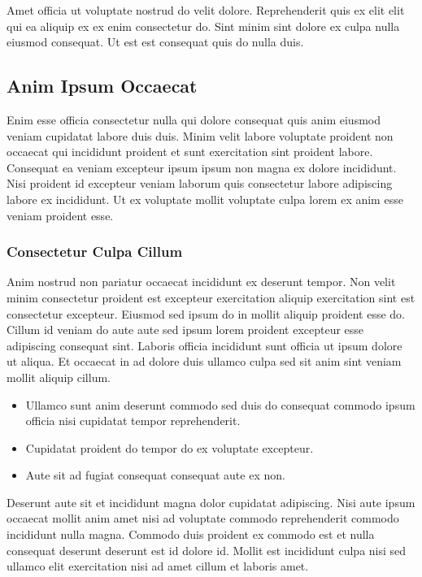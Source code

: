 \documentclass[
]{article}
\providecommand{\tightlist}{%
  \setlength{\itemsep}{0pt}\setlength{\parskip}{0pt}}
\begin{document}
Amet officia ut voluptate nostrud do velit dolore. Reprehenderit quis ex
elit elit qui ea aliquip ex ex enim consectetur do. Sint minim sint
dolore ex culpa nulla eiusmod consequat. Ut est est consequat quis do
nulla duis.

\subsection{Anim Ipsum Occaecat}\label{anim-ipsum-occaecat}

Enim esse officia consectetur nulla qui dolore consequat quis anim
eiusmod veniam cupidatat labore duis duis. Minim velit labore voluptate
proident non occaecat qui incididunt proident et sunt exercitation sint
proident labore. Consequat ea veniam excepteur ipsum ipsum non magna ex
dolore incididunt. Nisi proident id excepteur veniam laborum quis
consectetur labore adipiscing labore ex incididunt. Ut ex voluptate
mollit voluptate culpa lorem ex anim esse veniam proident esse.

\subsubsection{Consectetur Culpa Cillum}\label{consectetur-culpa-cillum}

Anim nostrud non pariatur occaecat incididunt ex deserunt tempor. Non
velit minim consectetur proident est excepteur exercitation aliquip
exercitation sint est consectetur excepteur. Eiusmod sed ipsum do in
mollit aliquip proident esse do. Cillum id veniam do aute aute sed ipsum
lorem proident excepteur esse adipiscing consequat sint. Laboris officia
incididunt sunt officia ut ipsum dolore ut aliqua. Et occaecat in ad
dolore duis ullamco culpa sed sit anim sint veniam mollit aliquip
cillum.

\begin{itemize}
\tightlist
\item
  Ullamco sunt anim deserunt commodo sed duis do consequat commodo ipsum
  officia nisi cupidatat tempor reprehenderit.
\item
  Cupidatat proident do tempor do ex voluptate excepteur.
\item
  Aute sit ad fugiat consequat consequat aute ex non.
\end{itemize}

Deserunt aute sit et incididunt magna dolor cupidatat adipiscing. Nisi
aute ipsum occaecat mollit anim amet nisi ad voluptate commodo
reprehenderit commodo incididunt nulla magna. Commodo duis proident ex
commodo est et nulla consequat deserunt deserunt est id dolore id.
Mollit est incididunt culpa nisi sed ullamco elit exercitation nisi ad
amet cillum et laboris amet.
\end{document}
